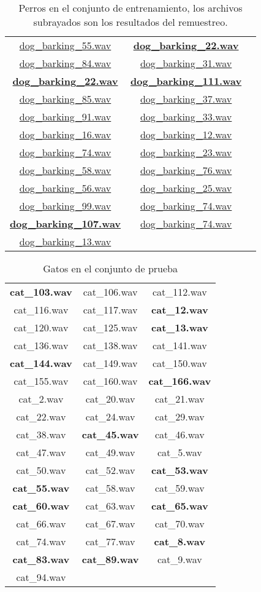 \documentclass[twocolumn,10pt]{asme2ej}
\begin{document}
\begin{table}[h]
\begin{tabular}{ccc}
\underline{dog\_barking\_55.wav} & \textbf{\underline{dog\_barking\_22.wav}}\\
\underline{dog\_barking\_84.wav} & \underline{dog\_barking\_31.wav}\\
\textbf{\underline{dog\_barking\_22.wav}} & \textbf{\underline{dog\_barking\_111.wav}}\\
\underline{dog\_barking\_85.wav} & \underline{dog\_barking\_37.wav}\\
\underline{dog\_barking\_91.wav} & \underline{dog\_barking\_33.wav}\\
\underline{dog\_barking\_16.wav} & \underline{dog\_barking\_12.wav}\\
\underline{dog\_barking\_74.wav} & \underline{dog\_barking\_23.wav}\\
\underline{dog\_barking\_58.wav} & \underline{dog\_barking\_76.wav}\\
\underline{dog\_barking\_56.wav} & \underline{dog\_barking\_25.wav}\\
\underline{dog\_barking\_99.wav} & \underline{dog\_barking\_74.wav}\\
\textbf{\underline{dog\_barking\_107.wav}} & \underline{dog\_barking\_74.wav}\\
\underline{dog\_barking\_13.wav}
\end{tabular}
\caption{Perros en el conjunto de entrenamiento, los archivos subrayados son los resultados del remuestreo.}
\label{tbl:conjunto_entre_perro}
\end{table}
 \begin{table}[h]
\begin{tabular}{ccc}
\textbf{cat\_103.wav} & cat\_106.wav & cat\_112.wav\\
cat\_116.wav & cat\_117.wav & \textbf{cat\_12.wav}\\
cat\_120.wav & cat\_125.wav & \textbf{cat\_13.wav}\\
cat\_136.wav & cat\_138.wav & cat\_141.wav\\
\textbf{cat\_144.wav} & cat\_149.wav & cat\_150.wav\\
cat\_155.wav & cat\_160.wav & \textbf{cat\_166.wav}\\
cat\_2.wav & cat\_20.wav & cat\_21.wav\\
cat\_22.wav & cat\_24.wav & cat\_29.wav\\
cat\_38.wav & \textbf{cat\_45.wav} & cat\_46.wav\\
cat\_47.wav & cat\_49.wav & cat\_5.wav\\
cat\_50.wav & cat\_52.wav & \textbf{cat\_53.wav}\\
\textbf{cat\_55.wav} & cat\_58.wav & cat\_59.wav\\
\textbf{cat\_60.wav} & cat\_63.wav & \textbf{cat\_65.wav}\\
cat\_66.wav & cat\_67.wav & cat\_70.wav\\
cat\_74.wav & cat\_77.wav & \textbf{cat\_8.wav}\\
\textbf{cat\_83.wav} & \textbf{cat\_89.wav} & cat\_9.wav\\
cat\_94.wav
\end{tabular}
\caption{Gatos en el conjunto de prueba}
\label{tbl:conjunto_prueba_gato}
\end{table}
\end{document}
